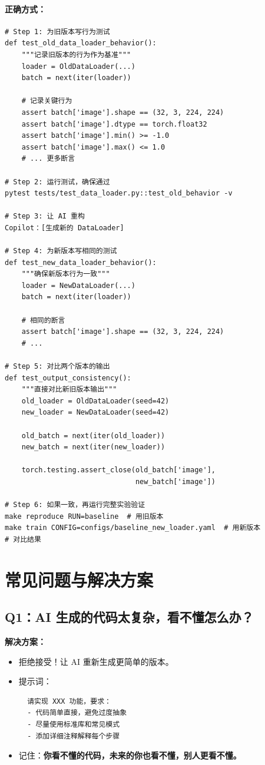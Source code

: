 \paragraph{正确方式：}
\begin{verbatim}
# Step 1: 为旧版本写行为测试
def test_old_data_loader_behavior():
    """记录旧版本的行为作为基准"""
    loader = OldDataLoader(...)
    batch = next(iter(loader))

    # 记录关键行为
    assert batch['image'].shape == (32, 3, 224, 224)
    assert batch['image'].dtype == torch.float32
    assert batch['image'].min() >= -1.0
    assert batch['image'].max() <= 1.0
    # ... 更多断言

# Step 2: 运行测试，确保通过
pytest tests/test_data_loader.py::test_old_behavior -v

# Step 3: 让 AI 重构
Copilot：[生成新的 DataLoader]

# Step 4: 为新版本写相同的测试
def test_new_data_loader_behavior():
    """确保新版本行为一致"""
    loader = NewDataLoader(...)
    batch = next(iter(loader))

    # 相同的断言
    assert batch['image'].shape == (32, 3, 224, 224)
    # ...

# Step 5: 对比两个版本的输出
def test_output_consistency():
    """直接对比新旧版本输出"""
    old_loader = OldDataLoader(seed=42)
    new_loader = NewDataLoader(seed=42)

    old_batch = next(iter(old_loader))
    new_batch = next(iter(new_loader))

    torch.testing.assert_close(old_batch['image'],
                               new_batch['image'])

# Step 6: 如果一致，再运行完整实验验证
make reproduce RUN=baseline  # 用旧版本
make train CONFIG=configs/baseline_new_loader.yaml  # 用新版本
# 对比结果
\end{verbatim}

\section{常见问题与解决方案}

\subsection{Q1：AI 生成的代码太复杂，看不懂怎么办？}

\textbf{解决方案：}
\begin{itemize}
  \item 拒绝接受！让 AI 重新生成更简单的版本。
  \item 提示词：\begin{verbatim}
  请实现 XXX 功能，要求：
  - 代码简单直接，避免过度抽象
  - 尽量使用标准库和常见模式
  - 添加详细注释解释每个步骤
  \end{verbatim}
  \item 记住：\textbf{你看不懂的代码，未来的你也看不懂，别人更看不懂。}
\end{itemize}


